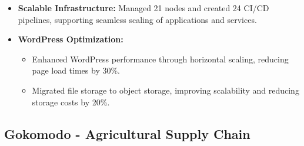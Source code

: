\documentclass[11pt]{article}
\begin{document}
\begin{itemize}
\begin{itemize}
        \item \textbf{Scalable Infrastructure:} Managed 21 nodes and created 24 CI/CD pipelines, supporting seamless scaling of applications and services.
        \item \textbf{WordPress Optimization:} 
        \begin{itemize}
            \item Enhanced WordPress performance through horizontal scaling, reducing page load times by 30\%.
            \item Migrated file storage to object storage, improving scalability and reducing storage costs by 20\%.
        \end{itemize}
    \end{itemize}
\end{itemize}

\subsection{Gokomodo - Agricultural Supply Chain}
\end{document}
